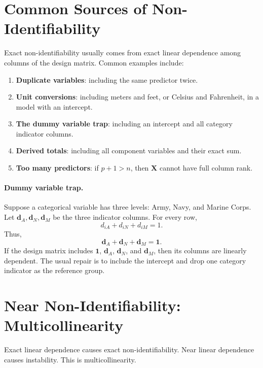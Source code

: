 \section{Common Sources of Non-Identifiability}

Exact non-identifiability usually comes from exact linear dependence among columns of the design matrix.  Common examples include:
\begin{enumerate}
  \item \textbf{Duplicate variables}: including the same predictor twice.
  \item \textbf{Unit conversions}: including meters and feet, or Celsius and Fahrenheit, in a model with an intercept.
  \item \textbf{The dummy variable trap}: including an intercept and all category indicator columns.
  \item \textbf{Derived totals}: including all component variables and their exact sum.
  \item \textbf{Too many predictors}: if \(p+1>n\), then \(\mathbf{X}\) cannot have full column rank.
\end{enumerate}

\paragraph{Dummy variable trap.}
Suppose a categorical variable has three levels: Army, Navy, and Marine Corps.  Let \(\mathbf{d}_A,\mathbf{d}_N,\mathbf{d}_M\) be the three indicator columns.  For every row,
\begin{equation}
  d_{iA}+d_{iN}+d_{iM}=1.
\end{equation}
Thus,
\begin{equation}
  \mathbf{d}_A+\mathbf{d}_N+\mathbf{d}_M=\mathbf{1}.
\end{equation}
If the design matrix includes \(\mathbf{1}\), \(\mathbf{d}_A\), \(\mathbf{d}_N\), and \(\mathbf{d}_M\), then its columns are linearly dependent.  The usual repair is to include the intercept and drop one category indicator as the reference group.

\section{Near Non-Identifiability: Multicollinearity}

Exact linear dependence causes exact non-identifiability.  Near linear dependence causes instability.  This is multicollinearity.

